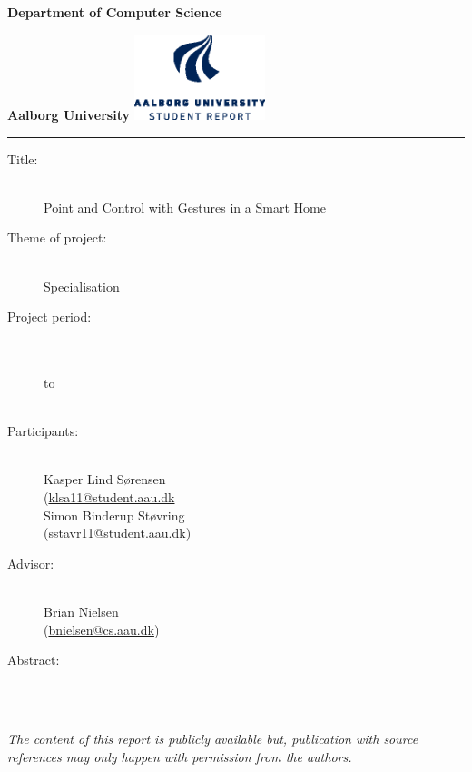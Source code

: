 {\setlength{\parindent}{0pt}
\begin{nopagebreak}
  \begin{minipage}{\textwidth}
    \vspace{2cm}
    \LARGE{\textbf{Department of Computer Science}}\vspace{-2.1cm}

    \large{\textbf{Aalborg University}}
    \hspace{8cm}\includegraphics[height=2.5cm]{images/aau_logo_en_blue.eps}
  \end{minipage}
  \vspace{0.1cm}
  \hrule

  \newcommand{\titleitem}[2]{\item[#1:] ~\\ #2 \\}
  \begin{multicols}{2}
  	\begin{description}
  		\titleitem{Title}{Point and Control with Gestures in a Smart Home}
  		\titleitem{Theme of project}{Specialisation}
  		\titleitem{Project period}{\protect{}\\ to\\ \protect\formatdate{21}{12}{2015}}
  		\titleitem{Participants}{
  			Kasper Lind Sørensen \\(\url{klsa11@student.aau.dk}\\
  			Simon Binderup Støvring \\(\url{sstavr11@student.aau.dk})
  			}
  		\titleitem{Advisor}{Brian Nielsen\\(\url{bnielsen@cs.aau.dk})}
  	\end{description}
    \vfill
    \columnbreak

    \begin{description}
    	\titleitem{Abstract}{}
    \end{description}

  \end{multicols}
  \vfill

  \begin{center}
    \textit{The content of this report is publicly available but,
    publication with source references may only happen with permission from
    the authors.}
  \end{center}
\end{nopagebreak}
}